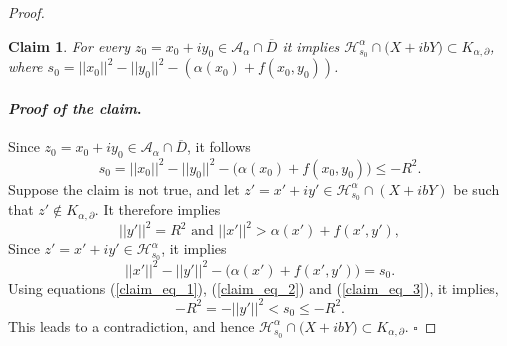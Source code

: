\documentclass[12pt,reqno, a4paper]{amsart}
\newtheorem{claim}[theorem]{Claim}
\theoremstyle{definition}
\newenvironment{claimproof}{\paragraph{\textit{Proof of the claim}.}}{\hfill$\square$}
\theoremstyle{definition}
\numberwithin{equation}{section}
\begin{document}
\begin{proof}
\begin{claim}\label{claim_1}
For every $z_0=x_0+iy_0 \in \mathcal{A}_{\alpha} \cap \overline{D} $ it implies $\mathcal{H}_{s_0}^{\alpha}\cap \big(X+ibY\big)\subset {K_{\alpha, \partial}}$, where $s_0=||x_0||^2-||y_0||^2- (\alpha(x_0)+f(x_0,y_0))$. 
\end{claim}
\begin{claimproof}
Since $z_0 =x_0+iy_0\in \mathcal{A}_{\alpha} \cap \overline{D}$, it follows
\begin{equation}\label{claim_eq_1}
	s_0=||x_0||^2-||y_0||^2-\big(\alpha(x_0)+f(x_0,y_0)\big)\leq -R^2.
\end{equation}
Suppose the claim is not true, and let ${z'=x'+iy' \in \mathcal{H}_{s_0}^{\alpha}\cap (X+ibY)}$ be such that $z'\notin K_{\alpha, \partial}.$ It therefore implies
\begin{equation}\label{claim_eq_2}
||y'||^2=R^2 \text{ and } ||x'||^2>\alpha(x')+f(x',y'),
\end{equation}
Since $z'=x'+iy'\in \mathcal{H}_{s_0}^{\alpha}$, it implies 
\begin{equation}\label{claim_eq_3}
	||x'||^2-||y'||^2-\big(\alpha(x')+f(x',y')\big)=s_0.
\end{equation}
Using equations (\ref{claim_eq_1}), (\ref{claim_eq_2}) and (\ref{claim_eq_3}), it implies, 
$$-R^2=-||y'||^2<s_0\leq -R^2. $$
This leads to a contradiction, and hence $\mathcal{H}_{s_0}^{\alpha}\cap \big(X+ibY\big)\subset K_{\alpha, \partial}$.
\end{claimproof}


\end{proof}
\end{document}
